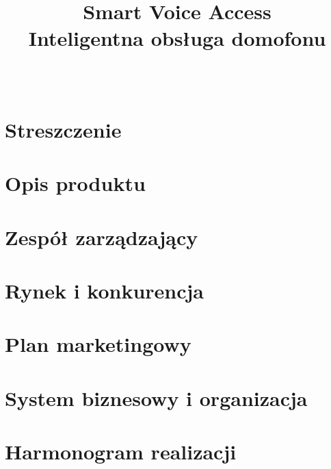 \documentclass{classrep}
\author{
    \studentinfo[216793@edu.p.lodz.pl]{Jan Karwowski}{216793}\\
    \studentinfo[216806@edu.p.lodz.pl]{Kamil Kowalewski}{216806}
}
\title{\textbf{Smart Voice Access}\\ Inteligentna obsługa domofonu}
\begin{document}
 {

    \maketitle
    \thispagestyle{fancyplain}

    \null\newpage
    \tableofcontents
    \null\newpage

    \section*{Streszczenie}
    \label{chapter0:strzeszczenie} {
        
    }

    \section{Opis produktu}
    \label{chapter1:opis_produktu} {
        
    }

    \section{Zespół zarządzający}
    \label{chapter2:zespol_zarzadzajacy} {
        
    }

    \section{Rynek i konkurencja}
    \label{chapter3:rynek_konkurecja} {
        
    }

    \section{Plan marketingowy}
    \label{chapter4:plan_marketingowy} {
        
    }

    \section{System biznesowy i organizacja}
    \label{chapter5:system_biznesowy} {
        
    }

    \section{Harmonogram realizacji}
    \label{chapter6:harmonogram_realizacji} {
        
    }

}
\end{document}
